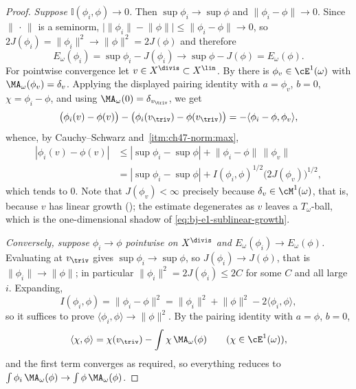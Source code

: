 \begin{proof}
\emph{Suppose $\mathbb I(\phi_i,\phi)\to0$.}  Then
$\sup\phi_i\to\sup\phi$ and $\lVert\phi_i-\phi\rVert\to0$.  Since
$\lVert\,\cdot\,\rVert$ is a seminorm,
$\bigl|\lVert\phi_i\rVert-\lVert\phi\rVert\bigr|
\le\lVert\phi_i-\phi\rVert\to0$, so
$2J(\phi_i)=\lVert\phi_i\rVert^2\to\lVert\phi\rVert^2=2J(\phi)$ and
therefore
\[
 E_\omega(\phi_i)=\sup\phi_i-J(\phi_i)
 \longrightarrow\sup\phi-J(\phi)=E_\omega(\phi).
\]
For pointwise convergence let $v\in X^{\divis}\subset X^{\lin}$.  By
 there is $\phi_v\in\cE^1(\omega)$ with
$\MA_\omega(\phi_v)=\delta_v$.  Applying the displayed pairing identity
with $a=\phi_v$, $b=0$, $\chi=\phi_i-\phi$, and using
$\MA_\omega(0)=\delta_{v_{\triv}}$, we get
\[
 \bigl(\phi_i(v)-\phi(v)\bigr)-\bigl(\phi_i(v_{\triv})-\phi(v_{\triv})\bigr)
 =-\langle\phi_i-\phi,\phi_v\rangle,
\]
whence, by Cauchy--Schwarz and
\,\cref{itm:ch47-norm:max},
\[
 \begin{aligned}
 |\phi_i(v)-\phi(v)|
 &\le|\sup\phi_i-\sup\phi|
   +\lVert\phi_i-\phi\rVert\,\lVert\phi_v\rVert\\
 &=|\sup\phi_i-\sup\phi|
   +I(\phi_i,\phi)^{1/2}\bigl(2J(\phi_v)\bigr)^{1/2},
 \end{aligned}
\]
which tends to $0$.  Note that $J(\phi_v)<\infty$ precisely because
$\delta_v\in\cM^1(\omega)$, that is, because $v$ has linear growth
(); the estimate degenerates as $v$
leaves a $T_\omega$-ball, which is the one-dimensional shadow of
\eqref{eq:bj-e1-sublinear-growth}.

\emph{Conversely, suppose $\phi_i\to\phi$ pointwise on $X^{\divis}$ and
$E_\omega(\phi_i)\to E_\omega(\phi)$.}  Evaluating at $v_{\triv}$ gives
$\sup\phi_i\to\sup\phi$, so $J(\phi_i)\to J(\phi)$, that is
$\lVert\phi_i\rVert\to\lVert\phi\rVert$; in particular
$\lVert\phi_i\rVert^2=2J(\phi_i)\le2C$ for some $C$ and all large
$i$.  Expanding,
\[
 I(\phi_i,\phi)=\lVert\phi_i-\phi\rVert^2
 =\lVert\phi_i\rVert^2+\lVert\phi\rVert^2-2\langle\phi_i,\phi\rangle,
\]
so it suffices to prove $\langle\phi_i,\phi\rangle\to\lVert\phi\rVert^2$.
By the pairing identity with $a=\phi$, $b=0$,
\[
 \langle\chi,\phi\rangle
 =\chi(v_{\triv})-\int\chi\,\MA_\omega(\phi)
 \qquad(\chi\in\cE^1(\omega)),
\]
and the first term converges as required, so everything reduces to
$\int\phi_i\,\MA_\omega(\phi)\to\int\phi\,\MA_\omega(\phi)$.


\end{proof}
